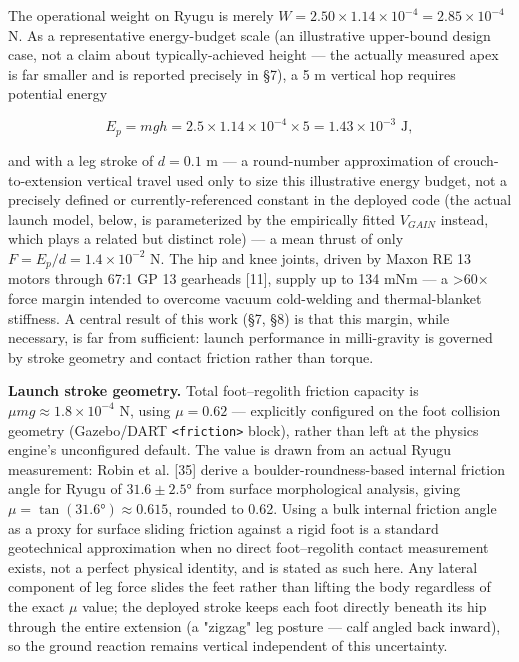 \documentclass[conference]{IEEEtran}
\begin{document}
The operational weight on Ryugu is merely $W = 2.50 \times 1.14\times10^{-4} = 2.85\times10^{-4}$ N. As a representative energy-budget scale (an illustrative upper-bound design case, not a claim about typically-achieved height --- the actually measured apex is far smaller and is reported precisely in \S7), a 5 m vertical hop requires potential energy

\begin{equation*}E_p = mgh = 2.5 \times 1.14\times10^{-4} \times 5 = 1.43\times10^{-3} \text{ J},\end{equation*}

and with a leg stroke of $d = 0.1$ m --- a round-number approximation of crouch-to-extension vertical travel used only to size this illustrative energy budget, not a precisely defined or currently-referenced constant in the deployed code (the actual launch model, below, is parameterized by the empirically fitted $V_{GAIN}$ instead, which plays a related but distinct role) --- a mean thrust of only $F = E_p/d = 1.4\times10^{-2}$ N. The hip and knee joints, driven by Maxon RE 13 motors through 67:1 GP 13 gearheads [11], supply up to 134 mNm --- a >60\ensuremath{\times} force margin intended to overcome vacuum cold-welding and thermal-blanket stiffness. A central result of this work (\S7, \S8) is that this margin, while necessary, is far from sufficient: launch performance in milli-gravity is governed by stroke geometry and contact friction rather than torque.

\textbf{Launch stroke geometry.} Total foot--regolith friction capacity is $\mu m g \approx 1.8\times10^{-4}$ N, using $\mu = 0.62$ --- explicitly configured on the foot collision geometry (Gazebo/DART \texttt{<friction>} block), rather than left at the physics engine's unconfigured default. The value is drawn from an actual Ryugu measurement: Robin et al. [35] derive a boulder-roundness-based internal friction angle for Ryugu of $31.6\pm2.5°$ from surface morphological analysis, giving $\mu = \tan(31.6°) \approx 0.615$, rounded to 0.62. Using a bulk internal friction angle as a proxy for surface sliding friction against a rigid foot is a standard geotechnical approximation when no direct foot--regolith contact measurement exists, not a perfect physical identity, and is stated as such here. Any lateral component of leg force slides the feet rather than lifting the body regardless of the exact $\mu$ value; the deployed stroke keeps each foot directly beneath its hip through the entire extension (a "zigzag" leg posture --- calf angled back inward), so the ground reaction remains vertical independent of this uncertainty.
\end{document}
